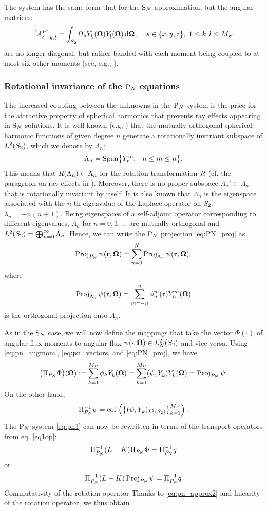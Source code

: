 The system has the same form 
that for the $\SN$ approximation, but the angular matrices:
$$
	\left[A_s^P\right]_{k,l} = \intA{\Omega_s \Y{k}{}(\bomega)\Yc{l}{}(\bomega)},\quad s\in\{x,y,z\},\ 
	1 \leq k,l \leq  M_P
$$
are no longer diagonal, but rather banded with each moment being coupled to at
most six other moments (see, e.g., \cite{Sanchez8}).


\subsubsection{Rotational invariance of the $\PN$ equations}
The increased coupling between the unknowns in the $\PN$ system is the price for the attractive property of spherical
harmonics that prevents ray effects appearing in $\SN$ solutions. It is well known (e.g, \cite[Chap.3]{Sansone}) that
the mutually orthogonal spherical harmonic functions of given degree $n$ generate a rotationally invariant subspace of
$\Lp[2](\Sphere)$, which we denote by $\Lambda_n$:
\begin{equation}
	\label{eq:subspace}
    	\Lambda_n = \text{Span}\bigl\{\Y{n}{m}; -n \leq m \leq n\bigr\},
\end{equation}
This means that $\op{R}(\Lambda_n) \subset \Lambda_n$ for the rotation transformation $\op{R}$ (cf. the
paragraph on ray effects in \Sref{sec:1-SN}). Moreover, there is no proper subspace $\Lambda_n' \subset \Lambda_n$ that
is rotationally invariant by itself. It is also known that $\Lambda_n$ is the eigenspace associated with the $n$-th
eigenvalue of the Laplace operator on $\Sphere$, $\lambda_n = -n(n+1)$. Being eigenspaces of a self-adjoint operator corresponding to different eigenvalues, $\Lambda_n$ for $n=0,1,\ldots$ are mutually orthogonal and $\Lp[2](\Sphere) = \bigoplus_{n=0}^{\infty}\Lambda_n$.
Hence, we can write the $\PN$ projection \eqref{eq:PN_proj} as
\begin{equation}\label{eq:pn_approx2}
	\Projop\psi(\br,\bomega) = \suma[n]{0}{N}\Projop[\Lambda_n]\psi(\br,\bomega),
\end{equation}
where 
$$
	\Projop[\Lambda_n]\psi(\br,\bomega) = \suma[m]{-n}{n}\angmom{n}{m}(\br)\Y{n}{m}(\bomega)
$$
is the orthogonal projection onto $\Lambda_n$.  

As in the $\SN$ case, we will now define the mappings that take the vector $\Phi(\cdot)$ of angular flux moments to
angular flux $\psi(\cdot,\bomega)\in\Lp[2]_N(\Sphere)$ and vice versa. Using \eqref{eq:pn_angmom}, 
\eqref{eq:pn_vectors} and \eqref{eq:PN_proj}, we have
$$
\bigl(\PiPN\Phi\bigr)(\bomega) := \sum_{k=1}^{ M_P} \phi_k\Y{k}{}(\bomega) = \sum_{k=1}^{ M_P}(\psi,
\Y{k}{})\Y{k}{}(\bomega) = \Projop\psi.
$$
On the other hand,
$$
\PiPN^{-1}\psi = \col\left( \left\{(\psi, \Y{k}{})_{\Lp[2](\Sphere)}\right\}_{k=1}^{M_P} \right).
$$
The $\PN$ system \eqref{eq:pn1} can now be rewritten in terms of the transport operators from eq. \eqref{eq1op}:
$$
	\PiPN^{-1} (L-K) \PiPN\Phi = \PiPN^{-1} q
$$
or
$$
	\PiPN^{-1} (L-K) \Projop\psi = \PiPN^{-1} q
$$
Commutativity of the rotation operator 
Thanks to \eqref{eq:pn_approx2} and linearity of the rotation operator, we thus obtain

